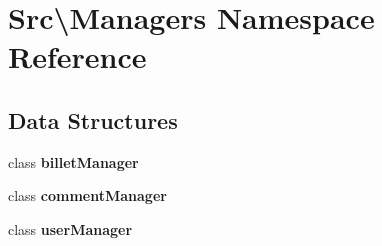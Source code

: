 \section{Src\textbackslash{}Managers Namespace Reference}
\label{namespace_src_1_1_managers}
\subsection*{Data Structures}
\begin{DoxyCompactItemize}
\item 
class \textbf{ billet\+Manager}
\item 
class \textbf{ comment\+Manager}
\item 
class \textbf{ user\+Manager}
\end{DoxyCompactItemize}
